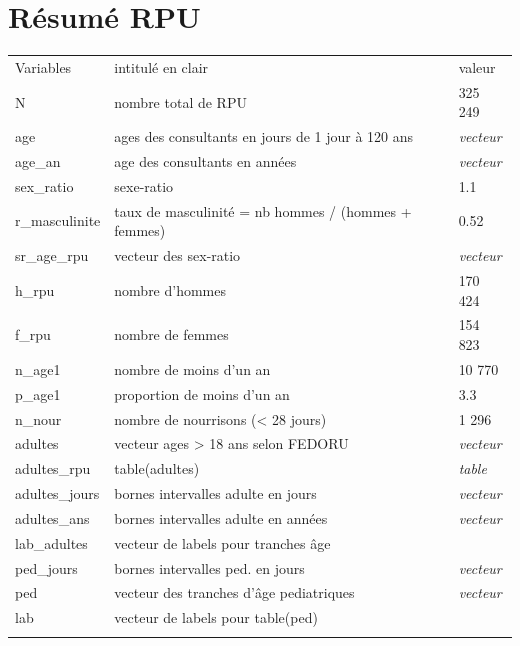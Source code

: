 \documentclass[]{article}
\begin{document}
\section{Résumé RPU}\label{resume-rpu}

\begin{longtable}[c]{@{}lll@{}}
\toprule\addlinespace
Variables & intitulé en clair & valeur
\\\addlinespace
\midrule\endhead
N & nombre total de RPU & 325 249
\\\addlinespace
age & ages des consultants en jours de 1 jour à 120 ans & \emph{vecteur}
\\\addlinespace
age\_an & age des consultants en années & \emph{vecteur}
\\\addlinespace
sex\_ratio & sexe-ratio & 1.1
\\\addlinespace
r\_masculinite & taux de masculinité = nb hommes / (hommes + femmes) &
0.52
\\\addlinespace
sr\_age\_rpu & vecteur des sex-ratio & \emph{vecteur}
\\\addlinespace
h\_rpu & nombre d'hommes & 170 424
\\\addlinespace
f\_rpu & nombre de femmes & 154 823
\\\addlinespace
n\_age1 & nombre de moins d'un an & 10 770
\\\addlinespace
p\_age1 & proportion de moins d'un an & 3.3
\\\addlinespace
n\_nour & nombre de nourrisons (\textless{} 28 jours) & 1 296
\\\addlinespace
adultes & vecteur ages \textgreater{} 18 ans selon FEDORU &
\emph{vecteur}
\\\addlinespace
adultes\_rpu & table(adultes) & \emph{table}
\\\addlinespace
adultes\_jours & bornes intervalles adulte en jours & \emph{vecteur}
\\\addlinespace
adultes\_ans & bornes intervalles adulte en années & \emph{vecteur}
\\\addlinespace
lab\_adultes & vecteur de labels pour tranches âge &
\\\addlinespace
ped\_jours & bornes intervalles ped. en jours & \emph{vecteur}
\\\addlinespace
ped & vecteur des tranches d'âge pediatriques & \emph{vecteur}
\\\addlinespace
lab & vecteur de labels pour table(ped) &
\\\addlinespace
\bottomrule
\end{longtable}
\end{document}
